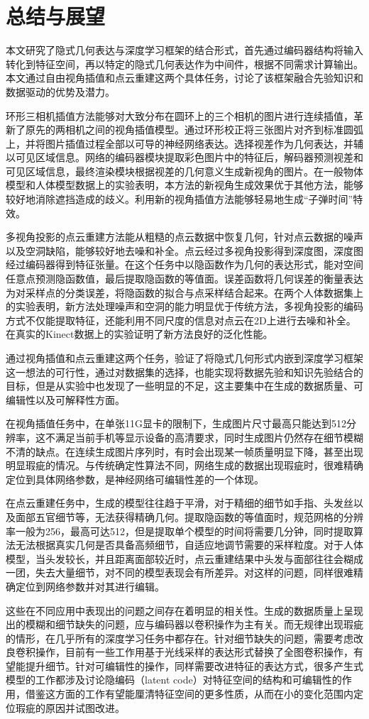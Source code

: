 \chapter{总结与展望}
本文研究了隐式几何表达与深度学习框架的结合形式，首先通过编码器结构将输入转化到特征空间，再以特定的隐式几何表达作为中间件，根据不同需求计算输出。本文通过自由视角插值和点云重建这两个具体任务，讨论了该框架融合先验知识和数据驱动的优势及潜力。

环形三相机插值方法能够对大致分布在圆环上的三个相机的图片进行连续插值，革新了原先的两相机之间的视角插值模型。通过环形校正将三张图片对齐到标准圆弧上，并将图片插值过程全部以可导的神经网络表达。选择视差作为几何表达，并辅以可见区域信息。网络的编码器模块提取彩色图片中的特征后，解码器预测视差和可见区域信息，最终渲染模块根据视差的几何意义生成新视角的图片。在一般物体模型和人体模型数据上的实验表明，本方法的新视角生成效果优于其他方法，能够较好地消除遮挡造成的歧义。利用新的视角插值方法能够轻易地生成“子弹时间”特效。

多视角投影的点云重建方法能从粗糙的点云数据中恢复几何，针对点云数据的噪声以及空洞缺陷，能够较好地去噪和补全。点云经过多视角投影得到深度图，深度图经过编码器得到特征张量。在这个任务中以隐函数作为几何的表达形式，能对空间任意点预测隐函数值，最后提取隐函数的等值面。误差函数将几何误差的衡量表达为对采样点的分类误差，将隐函数的拟合与点采样结合起来。在两个人体数据集上的实验表明，新方法处理噪声和空洞的能力明显优于传统方法，多视角投影的编码方式不仅能提取特征，还能利用不同尺度的信息对点云在2D上进行去噪和补全。在真实的Kinect数据上的实验证明了新方法良好的泛化性能。

通过视角插值和点云重建这两个任务，验证了将隐式几何形式内嵌到深度学习框架这一想法的可行性，通过对数据集的选择，也能实现将数据先验和知识先验结合的目标，但是从实验中也发现了一些明显的不足，这主要集中在生成的数据质量、可编辑性以及可解释性方面。

在视角插值任务中，在单张11G显卡的限制下，生成图片尺寸最高只能达到512分辨率，这不满足当前手机等显示设备的高清要求，同时生成图片仍然存在细节模糊不清的缺点。在连续生成图片序列时，有时会出现某一帧质量明显下降，甚至出现明显瑕疵的情况。与传统确定性算法不同，网络生成的数据出现瑕疵时，很难精确定位到具体网络参数，是神经网络可编辑性差的一个体现。

在点云重建任务中，生成的模型往往趋于平滑，对于精细的细节如手指、头发丝以及面部五官细节等，无法获得精确几何。提取隐函数的等值面时，规范网格的分辨率一般为256，最高可达512，但是提取单个模型的时间将需要几分钟，同时提取算法无法根据真实几何是否具备高频细节，自适应地调节需要的采样粒度。对于人体模型，当头发较长，并且距离面部较近时，点云重建结果中头发与面部往往会糊成一团，失去大量细节，对不同的模型表现会有所差异。对这样的问题，同样很难精确定位到网络参数并对其进行编辑。

这些在不同应用中表现出的问题之间存在着明显的相关性。生成的数据质量上呈现出的模糊和细节缺失的问题，应与编码器以卷积操作为主有关。而无规律出现瑕疵的情形，在几乎所有的深度学习任务中都存在。针对细节缺失的问题，需要考虑改良卷积操作，目前有一些工作用基于光线采样的表达形式替换了全图卷积操作，有望能提升细节。针对可编辑性的操作，同样需要改进特征的表达方式，很多产生式模型的工作都涉及讨论隐编码（latent code）对特征空间的结构和可编辑性的作用，借鉴这方面的工作有望能厘清特征空间的更多性质，从而在小的变化范围内定位瑕疵的原因并试图改进。

